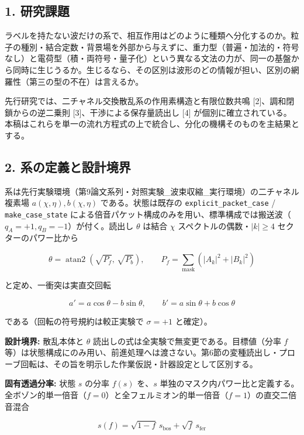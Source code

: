 \documentclass[
  a4paper,
]{ltjsarticle}
\begin{document}
\subsection{1. 研究課題}\label{ux7814ux7a76ux8ab2ux984c}

ラベルを持たない波だけの系で、相互作用はどのように種類へ分化するのか。粒子の種別・結合定数・背景場を外部から与えずに、重力型（普遍・加法的・符号なし）と電荷型（積・両符号・量子化）という異なる文法の力が、同一の基盤から同時に生じうるか。生じるなら、その区別は波形のどの情報が担い、区別の網羅性（第三の型の不在）は言えるか。

先行研究では、二チャネル交換散乱系の作用素構造と有限位数共鳴
{[}2{]}、調和閉鎖からの逆二乗則 {[}3{]}、干渉による保存量読出し {[}4{]}
が個別に確立されている。本稿はこれらを単一の流れ方程式の上で統合し、分化の機構そのものを主結果とする。

\subsection{2.
系の定義と設計境界}\label{ux7cfbux306eux5b9aux7fa9ux3068ux8a2dux8a08ux5883ux754c}

系は先行実験環境（第9論文系列・対照実験\_波束収縮\_実行環境）の二チャネル複素場
\(a(\chi,\eta), b(\chi,\eta)\) である。状態は既存の
\texttt{explicit\_packet\_case} / \texttt{make\_case\_state}
による倍音パケット構成のみを用い、標準構成では搬送波（\(q_A=+1, q_B=-1\)）が付く。読出し
\(\theta\) は結合 \(\chi\) スペクトルの偶数・\(|k|\ge4\)
セクターのパワー比から

\[
\theta=\operatorname{atan2}\!\left(\sqrt{P_f},\,\sqrt{P_b}\right),
\qquad
P_f=\sum_{\text{mask}}\left(|A_k|^2+|B_k|^2\right)
\]

と定め、一衝突は実直交回転

\[
a'=a\cos\theta-b\sin\theta,
\qquad
b'=a\sin\theta+b\cos\theta
\]

である（回転の符号規約は較正実験で \(\sigma=+1\) と確定）。

\textbf{設計境界:} 散乱本体と \(\theta\)
読出しの式は全実験で無変更である。目標値（分率 \(f\)
等）は状態構成にのみ用い、前進処理へは渡さない。第6節の変種読出し・プローブ回転は、その旨を明示した作業仮説・計器設定として区別する。

\textbf{固有透過分率:} 状態 \(s\) の分率 \(f(s)\) を、\(s\)
単独のマスク内パワー比と定義する。全ボゾン的単一倍音（\(f=0\)）と全フェルミオン的単一倍音（\(f=1\)）の直交二倍音混合

\[
s(f)=\sqrt{1-f}\,s_{\mathrm{bos}}+\sqrt{f}\,s_{\mathrm{fer}}
\]
\end{document}
